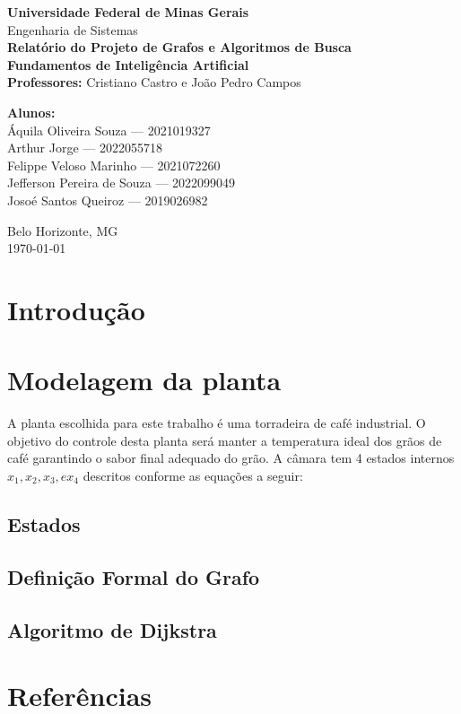 \documentclass[12pt,a4paper]{article}
\begin{document}
\begin{titlepage}
    \centering
    {\Large \textbf{Universidade Federal de Minas Gerais}}\\[0.3cm]
    {\large Engenharia de Sistemas}\\[2cm]
    
    {\Huge \textbf{Relatório do Projeto de Grafos e Algoritmos de Busca}}\\[1.5cm]
    
    \textbf{Fundamentos de Inteligência Artificial}\\[0.5cm]
    \textbf{Professores:} Cristiano Castro e João Pedro Campos\\[1.5cm]
    
    \begin{flushleft}
        \textbf{Alunos:}\\
        Áquila Oliveira Souza --- 2021019327\\
        Arthur Jorge --- 2022055718\\
        Felippe Veloso Marinho --- 2021072260\\
        Jefferson Pereira de Souza --- 2022099049\\
        Josoé Santos Queiroz --- 2019026982
    \end{flushleft}
    
    \vfill
    {\large Belo Horizonte, MG}\\
    {\large \today}
\end{titlepage}

\clearpage
\tableofcontents
\clearpage

\section{Introdução}

\section{Modelagem da planta}

A planta escolhida para este trabalho é uma torradeira de café industrial. O objetivo do controle desta planta será manter a temperatura ideal dos grãos de café garantindo o sabor final adequado do grão.
A câmara tem 4 estados internos $x_1, x_2, x_3, e x_4$ descritos conforme as equações a seguir: 




\subsection{Estados}
\subsection{Definição Formal do Grafo}

\subsection{Algoritmo de Dijkstra}
\section{Referências}
\clearpage
{}


\end{document}
